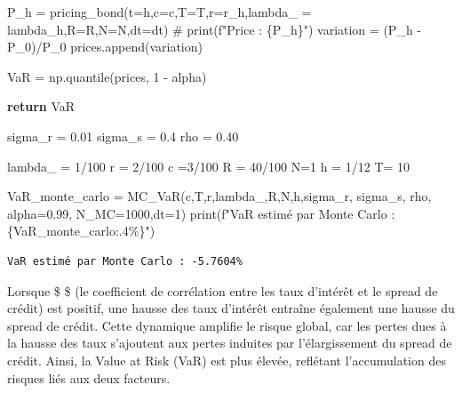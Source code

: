 \documentclass[
  letterpaper,
  DIV=11,
  numbers=noendperiod]{scrartcl}
\newenvironment{Shaded}{\begin{snugshade}}{\end{snugshade}}
\newcommand{\BuiltInTok}[1]{\textcolor[rgb]{0.00,0.23,0.31}{#1}}
\newcommand{\CommentTok}[1]{\textcolor[rgb]{0.37,0.37,0.37}{#1}}
\newcommand{\ControlFlowTok}[1]{\textcolor[rgb]{0.00,0.23,0.31}{\textbf{#1}}}
\newcommand{\DecValTok}[1]{\textcolor[rgb]{0.68,0.00,0.00}{#1}}
\newcommand{\FloatTok}[1]{\textcolor[rgb]{0.68,0.00,0.00}{#1}}
\newcommand{\NormalTok}[1]{\textcolor[rgb]{0.00,0.23,0.31}{#1}}
\newcommand{\OperatorTok}[1]{\textcolor[rgb]{0.37,0.37,0.37}{#1}}
\newcommand{\SpecialCharTok}[1]{\textcolor[rgb]{0.37,0.37,0.37}{#1}}
\newcommand{\SpecialStringTok}[1]{\textcolor[rgb]{0.13,0.47,0.30}{#1}}
\begin{document}
\begin{Shaded}
\begin{Highlighting}[]
\NormalTok{        P\_h }\OperatorTok{=}\NormalTok{ pricing\_bond(t}\OperatorTok{=}\NormalTok{h,c}\OperatorTok{=}\NormalTok{c,T}\OperatorTok{=}\NormalTok{T,r}\OperatorTok{=}\NormalTok{r\_h,lambda\_ }\OperatorTok{=}\NormalTok{ lambda\_h,R}\OperatorTok{=}\NormalTok{R,N}\OperatorTok{=}\NormalTok{N,dt}\OperatorTok{=}\NormalTok{dt)}
        \CommentTok{\# print(f"Price : \{P\_h\}")}
\NormalTok{        variation }\OperatorTok{=}\NormalTok{ (P\_h }\OperatorTok{{-}}\NormalTok{ P\_0)}\OperatorTok{/}\NormalTok{P\_0}
\NormalTok{        prices.append(variation)}


\NormalTok{    VaR }\OperatorTok{=}\NormalTok{ np.quantile(prices, }\DecValTok{1} \OperatorTok{{-}}\NormalTok{ alpha)}

    \ControlFlowTok{return}\NormalTok{ VaR}

\NormalTok{sigma\_r }\OperatorTok{=} \FloatTok{0.01}
\NormalTok{sigma\_s }\OperatorTok{=} \FloatTok{0.4}
\NormalTok{rho }\OperatorTok{=} \FloatTok{0.40}

\NormalTok{lambda\_ }\OperatorTok{=} \DecValTok{1}\OperatorTok{/}\DecValTok{100}
\NormalTok{r }\OperatorTok{=} \DecValTok{2}\OperatorTok{/}\DecValTok{100}
\NormalTok{c }\OperatorTok{=}\DecValTok{3}\OperatorTok{/}\DecValTok{100}
\NormalTok{R }\OperatorTok{=} \DecValTok{40}\OperatorTok{/}\DecValTok{100}
\NormalTok{N}\OperatorTok{=}\DecValTok{1}
\NormalTok{h }\OperatorTok{=} \DecValTok{1}\OperatorTok{/}\DecValTok{12}
\NormalTok{T}\OperatorTok{=} \DecValTok{10}

\NormalTok{VaR\_monte\_carlo }\OperatorTok{=}\NormalTok{ MC\_VaR(c,T,r,lambda\_,R,N,h,sigma\_r, sigma\_s, rho, alpha}\OperatorTok{=}\FloatTok{0.99}\NormalTok{, N\_MC}\OperatorTok{=}\DecValTok{1000}\NormalTok{,dt}\OperatorTok{=}\DecValTok{1}\NormalTok{)}
\BuiltInTok{print}\NormalTok{(}\SpecialStringTok{f"VaR estimé par Monte Carlo : }\SpecialCharTok{\{}\NormalTok{VaR\_monte\_carlo}\SpecialCharTok{:.4\%\}}\SpecialStringTok{"}\NormalTok{)}
\end{Highlighting}
\end{Shaded}

\begin{verbatim}
VaR estimé par Monte Carlo : -5.7604%
\end{verbatim}

Lorsque \$ \rho \$ (le coefficient de corrélation entre les taux
d'intérêt et le spread de crédit) est positif, une hausse des taux
d'intérêt entraîne également une hausse du spread de crédit. Cette
dynamique amplifie le risque global, car les pertes dues à la hausse des
taux s'ajoutent aux pertes induites par l'élargissement du spread de
crédit. Ainsi, la Value at Risk (VaR) est plus élevée, reflétant
l'accumulation des risques liés aux deux facteurs.
\end{document}
